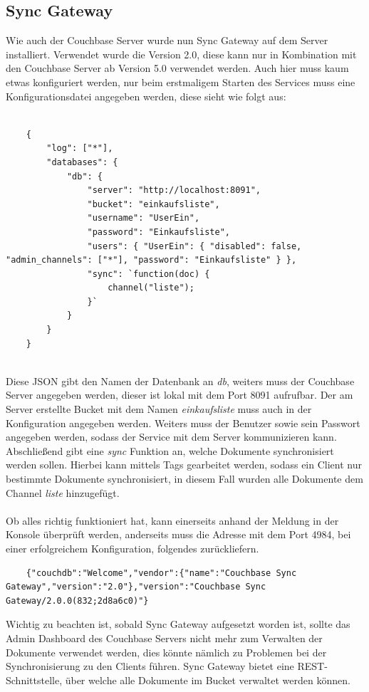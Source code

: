 \subsection{Sync Gateway}

Wie auch der Couchbase Server wurde nun Sync Gateway auf dem Server installiert. Verwendet wurde die Version 2.0, diese kann nur in Kombination mit den Couchbase Server ab Version 5.0 verwendet werden. Auch hier muss kaum etwas konfiguriert werden, nur beim erstmaligem Starten des Services muss eine Konfigurationsdatei angegeben werden, diese sieht wie folgt aus:
\\\\
\begin{verbatim}
	{
		"log": ["*"],
		"databases": {
			"db": {
				"server": "http://localhost:8091",
				"bucket": "einkaufsliste",
				"username": "UserEin",
				"password": "Einkaufsliste",
				"users": { "UserEin": { "disabled": false, "admin_channels": ["*"], "password": "Einkaufsliste" } },
				"sync": `function(doc) {
					channel("liste");
				}`
			}
		}
	}
	
\end{verbatim}

Diese JSON gibt den Namen der Datenbank an \textit{db}, weiters muss der Couchbase Server angegeben werden, dieser ist lokal mit dem Port 8091 aufrufbar. Der am Server erstellte Bucket mit dem Namen \textit{einkaufsliste} muss auch in der Konfiguration angegeben werden. Weiters muss der Benutzer sowie sein Passwort angegeben werden, sodass der Service mit dem Server kommunizieren kann. Abschließend gibt eine \textit{sync} Funktion an, welche Dokumente synchronisiert werden sollen. Hierbei kann mittels Tags gearbeitet werden, sodass ein Client nur bestimmte Dokumente synchronisiert, in diesem Fall wurden alle Dokumente dem Channel \textit{liste} hinzugefügt. \cite{couchbasechannel}
\\\\
Ob alles richtig funktioniert hat, kann einerseits anhand der Meldung in der Konsole überprüft werden, anderseits muss die Adresse mit dem Port 4984, bei einer erfolgreichem Konfiguration, folgendes zurückliefern. 

\begin{verbatim}
	{"couchdb":"Welcome","vendor":{"name":"Couchbase Sync Gateway","version":"2.0"},"version":"Couchbase Sync Gateway/2.0.0(832;2d8a6c0)"}
\end{verbatim}

Wichtig zu beachten ist, sobald Sync Gateway aufgesetzt worden ist, sollte das Admin Dashboard des Couchbase Servers nicht mehr zum Verwalten der Dokumente verwendet werden, dies könnte nämlich zu Problemen bei der Synchronisierung zu den Clients führen. Sync Gateway bietet eine REST-Schnittstelle, über welche alle Dokumente im Bucket verwaltet werden können. \cite{syncgateway} 

